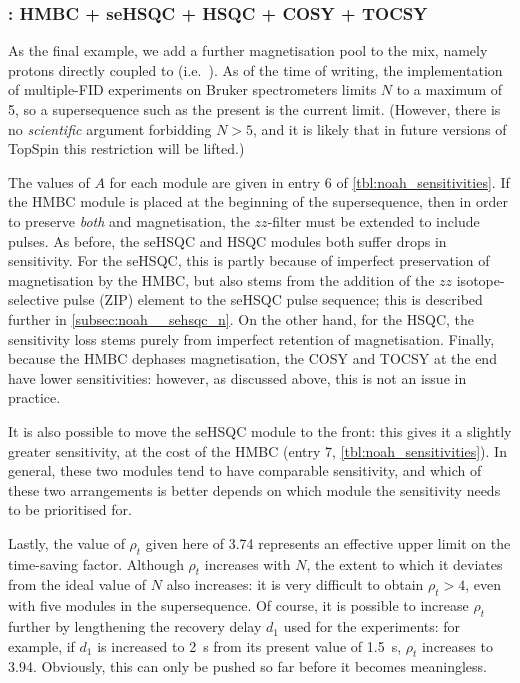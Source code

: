 \subsubsection{: HMBC + \nitrogen{} seHSQC + HSQC + COSY + TOCSY}

As the final example, we add a further magnetisation pool to the mix, namely protons directly coupled to \nitrogen{} (i.e.\ ).
As of the time of writing, the implementation of multiple-FID experiments on Bruker spectrometers limits $N$ to a maximum of 5, so a supersequence such as the present  is the current limit.
(However, there is no \textit{scientific} argument forbidding $N > 5$, and it is likely that in future versions of TopSpin this restriction will be lifted.)

The values of $A$ for each module are given in entry 6 of \cref{tbl:noah_sensitivities}.
If the HMBC module is placed at the beginning of the supersequence, then in order to preserve \textit{both}  and  magnetisation, the $zz$-filter must be extended to include \nitrogen{} pulses\autocite{Kupce2019JMR}.
As before, the \nitrogen{} seHSQC and \carbon{} HSQC modules both suffer drops in sensitivity.
For the \nitrogen{} seHSQC, this is partly because of imperfect preservation of  magnetisation by the HMBC, but also stems from the addition of the $zz$ isotope-selective pulse (ZIP) element to the seHSQC pulse sequence; this is described further in \cref{subsec:noah__sehsqc_n}.
On the other hand, for the \carbon{} HSQC, the sensitivity loss stems purely from imperfect retention of  magnetisation.
Finally, because the HMBC dephases  magnetisation, the COSY and TOCSY at the end have lower sensitivities: however, as discussed above, this is not an issue in practice.

It is also possible to move the \nitrogen{} seHSQC module to the front: this gives it a slightly greater sensitivity, at the cost of the HMBC (entry 7, \cref{tbl:noah_sensitivities}).
In general, these two modules tend to have comparable sensitivity, and which of these two arrangements is better depends on which module the sensitivity needs to be prioritised for.

Lastly, the value of $\rho_t$ given here of 3.74 represents an effective upper limit on the time-saving factor.
Although $\rho_t$ increases with $N$, the extent to which it deviates from the ideal value of $N$ also increases: it is very difficult to obtain $\rho_t > 4$, even with five modules in the supersequence.
Of course, it is possible to increase $\rho_t$ further by lengthening the recovery delay $d_1$ used for the experiments: for example, if $d_1$ is increased to \qty{2}{\s} from its present value of \qty{1.5}{\s}, $\rho_t$ increases to 3.94.
Obviously, this can only be pushed so far before it becomes meaningless.
